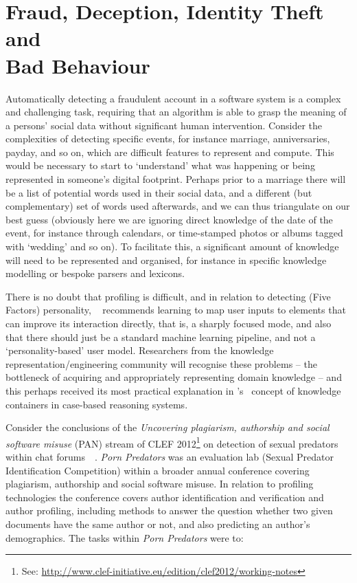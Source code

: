 \documentclass[letterpaper]{article}
\begin{document}
\section{Fraud, Deception, Identity Theft and\\Bad Behaviour}

Automatically detecting a fraudulent account in a software system is a
complex and challenging task, requiring that an algorithm is able to
grasp the meaning of a persons' social data without significant human
intervention. Consider the complexities of detecting specific events,
for instance marriage, anniversaries, payday, and so on, which are
difficult features to represent and compute. This would be necessary
to start to `understand' what was happening or being represented in
someone's digital footprint. Perhaps prior to a marriage there will be
a list of potential words used in their social data, and a different
(but complementary) set of words used afterwards, and we can thus
triangulate on our best guess (obviously here we are ignoring direct
knowledge of the date of the event, for instance through calendars, or
time-stamped photos or albums tagged with `wedding' and so on). To
facilitate this, a significant amount of knowledge will need to be
represented and organised, for instance in specific knowledge
modelling or bespoke parsers and lexicons.

There is no doubt that profiling is difficult, and in relation to
detecting (Five Factors) personality,
\citeauthor{mairesse:2013}~ recommends
learning to map user inputs to elements that can improve its
interaction directly, that is, a sharply focused mode, and also that
there should just be a standard machine learning pipeline, and not a
`personality-based' user model. Researchers from the knowledge
representation/engineering community will recognise these problems --
the bottleneck of acquiring and appropriately representing domain
knowledge -- and this perhaps received its most practical explanation
in \citeauthor{richter:2003}'s~ concept of
knowledge containers in case-based reasoning systems.

Consider the conclusions of the {\emph{Uncovering plagiarism,
authorship and social software misuse}} (PAN) stream of CLEF
2012\footnote{See:
\url{http://www.clef-initiative.eu/edition/clef2012/working-notes}} on
detection of sexual predators within chat
forums~~\cite{inches+crestani:2012}. {\emph{Porn Predators}} was an
evaluation lab (Sexual Predator Identification Competition) within a
broader annual conference covering plagiarism, authorship and social
software misuse. In relation to profiling technologies the conference
covers author identification and verification and author profiling,
including methods to answer the question whether two given documents
have the same author or not, and also predicting an author's
demographics. The tasks within {\emph{Porn Predators}} were to:
\end{document}
